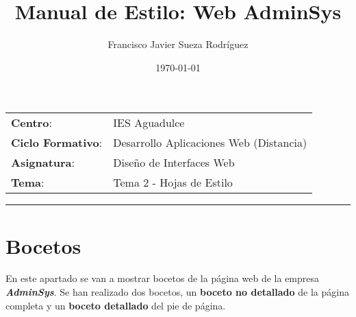 


\title{
\vspace{10ex}
\normalfont \normalsize
\huge \textbf{Manual de Estilo: Web AdminSys}
}
\author{Francisco Javier Sueza Rodríguez}
\date{\normalsize\today}



\maketitle

\thispagestyle{empty}

\vspace{75ex}

\begin{center}
    \begin{tabular}{l l}
        \textbf{Centro}: & IES Aguadulce \\
        \textbf{Ciclo Formativo}: & Desarrollo Aplicaciones Web (Distancia)\\
        \textbf{Asignatura}: & Diseño de Interfaces Web\\
        \textbf{Tema}: & Tema 2 -  Hojas de Estilo\\
    \end{tabular}
\end{center}

\newpage

\tableofcontents

\vspace{20ex}

\hrule

\vspace{18ex}

\listoffigures

\newpage

\section{Bocetos}
En este apartado se van a mostrar bocetos de la página web de la empresa \textit{\textbf{AdminSys}}. Se han realizado dos bocetos, un \textbf{boceto no detallado} de la página completa y un \textbf{boceto detallado} del pie de página.

